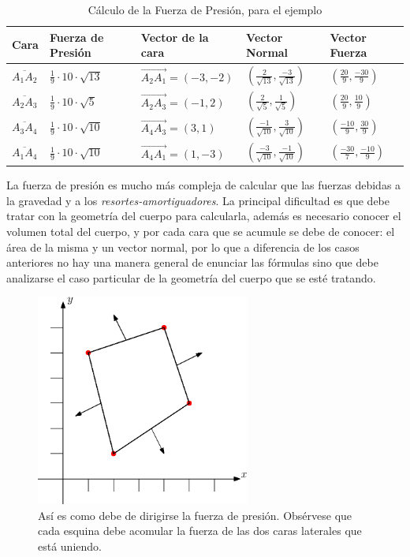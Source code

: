\begin{table}
\begin{center}
\begin{tabular} {@{}lllll@{}}
\toprule
Cara & Fuerza de Presión &  Vector de la cara & Vector Normal & Vector Fuerza \\ \midrule
$\overline{A_1A_2}$ & $\frac{1}{9} \cdot 10 \cdot \sqrt{13} $ & $\overrightarrow{A_2A_1} = (-3,-2)$ & $(\frac{2}{\sqrt{13}}, \frac{-3}{\sqrt{13}})$ & $(\frac{20}{9}, \frac{-30}{9})$ \\
$\overline{A_2A_3}$ & $\frac{1}{9} \cdot 10 \cdot \sqrt{5} $ & $\overrightarrow{A_2A_3} = (-1,2)$ & $(\frac{2}{\sqrt{5}}, \frac{1}{\sqrt{5}})$ & $(\frac{20}{9}, \frac{10}{9})$ \\
$\overline{A_3A_4}$ & $\frac{1}{9} \cdot 10 \cdot \sqrt{10} $ & $\overrightarrow{A_4A_3} = (3,1)$ & $(\frac{-1}{\sqrt{10}}, \frac{3}{\sqrt{10}})$ & $(\frac{-10}{9}, \frac{30}{9})$ \\
$\overline{A_1A_4}$ & $\frac{1}{9} \cdot 10 \cdot \sqrt{10} $ & $\overrightarrow{A_4A_1} = (1,-3)$ & $(\frac{-3}{\sqrt{10}}, \frac{-1}{\sqrt{10}})$ & $(\frac{-30}{7}, \frac{-10}{9})$ \\ 
\bottomrule
\end{tabular}
\end{center}
\caption[Ejemplo sobre cómo calcular la fuerza de presión]{Cálculo de la Fuerza de Presión, para el ejemplo}
\label{ejemplo:presion}
\end{table}

La fuerza de presión es mucho más compleja de calcular que las fuerzas debidas a la gravedad y a los \emph{resortes-amortiguadores}.
La principal dificultad es que debe tratar con la geometría del cuerpo para calcularla, además es necesario conocer el volumen total del cuerpo, y por cada cara que se acumule se debe de conocer: el área de la misma y un vector normal, por lo que a diferencia de los casos anteriores no hay una manera general de enunciar las fórmulas sino que debe analizarse el caso particular de la geometría del cuerpo que se esté tratando.

\begin{figure}
 \centering
 \includegraphics[width=7cm]{img/01/presion_bien}
 \caption[Vectores de presión correctos]{ 
 Así es como debe de dirigirse la fuerza de presión. Obsérvese que cada esquina debe acomular la fuerza de las dos caras laterales que está uniendo.
 } \label{presionBien:fig}
\end{figure}
